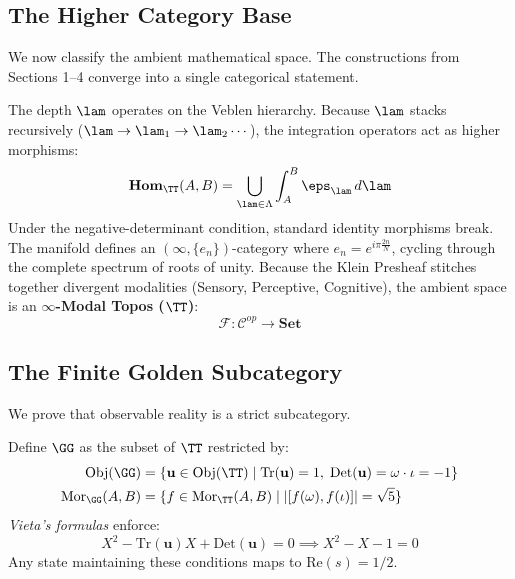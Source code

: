 \subsection{The Higher Category Base}

We now classify the ambient mathematical space. The constructions from Sections 1--4 converge into a single categorical statement.

\begin{definition}\label{def:topos}
The depth $\lam$ operates on the Veblen hierarchy. Because $\lam$ stacks recursively ($\lam \to \lam_1 \to \lam_2 \cdots$), the integration operators act as higher morphisms:
$$\mathbf{Hom}_{\TT}(A, B) = \bigcup_{\lam \in \Lambda} \int_A^B \eps_\lam \, d\lam$$
Under the negative-determinant condition, standard identity morphisms break. The manifold defines an $(\infty, \{e_n\})$-category where $e_n = e^{i\pi \frac{2n}{N}}$, cycling through the complete spectrum of roots of unity. Because the Klein Presheaf stitches together divergent modalities (Sensory, Perceptive, Cognitive), the ambient space is an \textbf{$\infty$-Modal Topos ($\TT$)}:
$$\mathcal{F} : \mathcal{C}^{op} \to \mathbf{Set}$$
\end{definition}

\subsection{The Finite Golden Subcategory}

We prove that observable reality is a strict subcategory.

\begin{theorem}\label{thm:golden-sub}
Define $\GG$ as the subset of $\TT$ restricted by:
\begin{align}
\mathrm{Obj}(\GG) &= \{ \mathbf{u} \in \mathrm{Obj}(\TT) \mid \mathrm{Tr}(\mathbf{u}) = 1,\; \mathrm{Det}(\mathbf{u}) = \omega \cdot \iota = -1 \} \\
\mathrm{Mor}_{\GG}(A,B) &= \{ f \in \mathrm{Mor}_{\TT}(A,B) \mid |[f(\omega), f(\iota)]| = \sqrt{5} \}
\end{align}
\emph{Vieta's formulas} enforce:
$$X^2 - \mathrm{Tr}(\mathbf{u})X + \mathrm{Det}(\mathbf{u}) = 0 \implies X^2 - X - 1 = 0$$
Any state maintaining these conditions maps to $\mathrm{Re}(s) = 1/2$.
\end{theorem}

